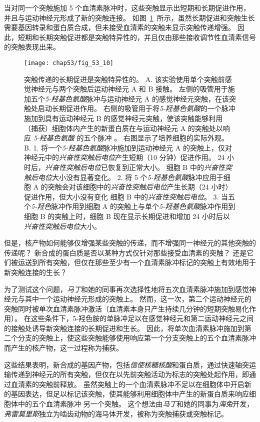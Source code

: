 当对同一个突触施加 5 个血清素脉冲时，这些突触显示出短期和长期促进作用，并且与运动神经元形成了新的突触连接。
如图~\ref{fig:53_10}~所示，虽然长期促进和突触生长需要基因转录和蛋白质合成，但未接受血清素的突触未显示突触传递增强。
因此，短期和长期突触促进都是突触特异性的，并且仅由那些接收调节性血清素信号的突触表现出来。


\begin{figure}[htbp]
	\centering
	\texttt{[image: chap53/fig\_53\_10]}
	\caption{突触传递的长期促进是突触特异性的\cite{martin1997synapse}。
		A. 该实验使用单个突触前感觉神经元与两个突触后运动神经元 A 和 B 接触。
		左侧的吸管用于施加五个\textit{5-羟基色氨酸}脉冲与运动神经元 A 的感觉神经元突触，在该突触处启动长期促进作用。
		右侧的吸管用于将\textit{5-羟基色氨酸}的一个脉冲施加到具有运动神经元 B 的感觉神经元突触，使该突触能够利用（捕获）细胞体内产生的新蛋白质在与运动神经元 A 的突触处以响应 \textit{5-羟基色氨酸} 的五个脉冲  。
		右图显示了培养细胞的实际外观。
		B. 1. 将一个\textit{5-羟基色氨酸}脉冲施加到运动神经元 A 的突触上，仅对神经元中的\textit{兴奋性突触后电位}产生短期（10 分钟）促进作用。
		24 小时后，\textit{兴奋性突触后电位}已恢复到正常大小。
		细胞 B 中的\textit{兴奋性突触后电位}大小没有显著变化。
		2. 将 5 个\textit{5-羟基色氨酸}脉冲应用于细胞 A 的突触会对该细胞中的\textit{兴奋性突触后电位}产生长期（24 小时）促进作用，但大小没有变化 细胞 B 中的\textit{兴奋性突触后电位}。
		3. 当五个\textit{5-羟色}脉冲作用到细胞 A 的突触上与单个\textit{5-羟基色氨酸}脉冲作用到细胞 B 的突触上时，细胞 B 现在显示长期促进和增加 24 小时后以\textit{兴奋性突触后电位}大小。}
	\label{fig:53_10}
\end{figure}


但是，核产物如何能够仅增强某些突触的传递，而不增强同一神经元的其他突触的传递呢？
新合成的蛋白质是否以某种方式仅针对那些接受血清素的突触？
还是它们被运送到所有突触，但仅在那些至少有一个血清素脉冲标记的突触上有效地用于新突触连接的生长？


为了测试这个问题，\textit{马丁}和她的同事再次选择性地将五次血清素脉冲施加到感觉神经元与其中一个运动神经元形成的突触上。
然而，这一次，第二个运动神经元的突触同时被单次血清素脉冲激活（血清素本身只产生持续几分钟的短期突触易化作用）。
在这些条件下，5-羟色胺的单脉冲足以在感觉神经元和第二运动神经元之间的接触处诱导新突触连接的长期促进和生长。
因此，将单次血清素脉冲施加到第二个分支的突触上，使这些突触能够使用响应第一个分支突触上的五个血清素脉冲而产生的核产物，这一过程称为捕获。


这些结果表明，新合成的基因产物，包括\textit{信使核糖核酸}和蛋白质，通过快速轴突运输传递到神经元的所有突触，但仅在以先前突触活动为标志的突触处起作用，即通过血清素的突触前释放。
虽然突触上的一个血清素脉冲不足以在细胞体中开启新的基因表达，但足以标记该突触，使其能够利用细胞体中产生的新蛋白质来响应细胞体中的五个血清素脉冲 另一个突触。
这个想法由\textit{马丁}和她的同事为\textit{海兔}开发，\textit{弗雷}\textit{莫里斯}独立为啮齿动物的海马体开发，被称为突触捕获或突触标记。


